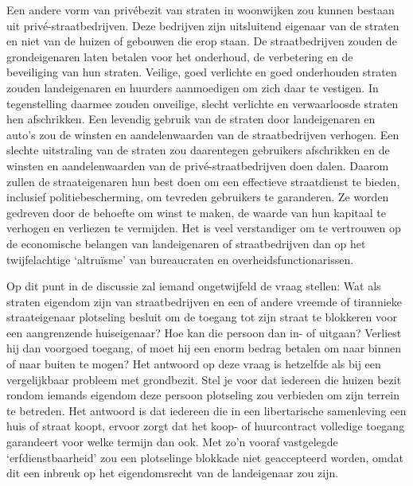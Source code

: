 \documentclass[
  a5paper,
  smalldemyvopaper,10pt,twoside,onecolumn,openright,extrafontsizes,hidelinks]{memoir}
\begin{document}
Een andere vorm van privébezit van straten in woonwijken zou kunnen
bestaan uit privé-straatbedrijven. Deze bedrijven zijn uitsluitend
eigenaar van de straten en niet van de huizen of gebouwen die erop
staan. De straatbedrijven zouden de grondeigenaren laten betalen voor
het onderhoud, de verbetering en de beveiliging van hun straten.
Veilige, goed verlichte en goed onderhouden straten zouden landeigenaren
en huurders aanmoedigen om zich daar te vestigen. In tegenstelling
daarmee zouden onveilige, slecht verlichte en verwaarloosde straten hen
afschrikken. Een levendig gebruik van de straten door landeigenaren en
auto's zou de winsten en aandelenwaarden van de straatbedrijven
verhogen. Een slechte uitstraling van de straten zou daarentegen
gebruikers afschrikken en de winsten en aandelenwaarden van de
privé-straatbedrijven doen dalen. Daarom zullen de straateigenaren hun
best doen om een effectieve straatdienst te bieden, inclusief
politiebescherming, om tevreden gebruikers te garanderen. Ze worden
gedreven door de behoefte om winst te maken, de waarde van hun kapitaal
te verhogen en verliezen te vermijden. Het is veel verstandiger om te
vertrouwen op de economische belangen van landeigenaren of
straatbedrijven dan op het twijfelachtige `altruïsme' van bureaucraten
en overheidsfunctionarissen.

Op dit punt in de discussie zal iemand ongetwijfeld de vraag stellen:
Wat als straten eigendom zijn van straatbedrijven en een of andere
vreemde of tirannieke straateigenaar plotseling besluit om de toegang
tot zijn straat te blokkeren voor een aangrenzende huiseigenaar? Hoe kan
die persoon dan in- of uitgaan? Verliest hij dan voorgoed toegang, of
moet hij een enorm bedrag betalen om naar binnen of naar buiten te
mogen? Het antwoord op deze vraag is hetzelfde als bij een vergelijkbaar
probleem met grondbezit. Stel je voor dat iedereen die huizen bezit
rondom iemands eigendom deze persoon plotseling zou verbieden om zijn
terrein te betreden. Het antwoord is dat iedereen die in een
libertarische samenleving een huis of straat koopt, ervoor zorgt dat het
koop- of huurcontract volledige toegang garandeert voor welke termijn
dan ook. Met zo'n vooraf vastgelegde `erfdienstbaarheid' zou een
plotselinge blokkade niet geaccepteerd worden, omdat dit een inbreuk op
het eigendomsrecht van de landeigenaar zou zijn.
\end{document}
